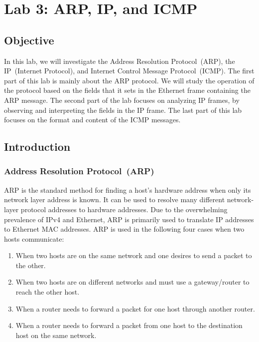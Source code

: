 \chapter{Lab 3: ARP, IP, and ICMP}\label{Lab3}

\section{Objective}

\noindent In this lab, we will investigate the Address Resolution Protocol~(ARP), the IP~(Internet Protocol), and Internet Control Message Protocol~(ICMP). The first part of this lab is mainly about the ARP protocol. We will study the operation of the protocol based on the fields that it sets in the Ethernet frame containing the ARP message.  The second part of the lab focuses on analyzing IP frames, by observing and interpreting the fields in the IP frame. The last part of this lab focuses on the format and content of the ICMP messages.

\section{Introduction}
\subsection{Address Resolution Protocol~(ARP)}
\par ARP is the standard method for finding a host's hardware address when only its network layer address is known.  It can be used to resolve many different network-layer protocol addresses to hardware addresses. Due to the overwhelming prevalence of IPv4 and Ethernet, ARP is primarily used to translate IP addresses to Ethernet MAC addresses. ARP is used in the following four cases when two hosts communicate:
\begin{enumerate}

\item When two hosts are on the same network and one desires to send a packet to the other.

\item When two hosts are on different networks and must use a gateway/router to reach the other host.

\item When a router needs to forward a packet for one host through another router.

\item When a router needs to forward a packet from one host to the destination host on the same network.
\end{enumerate}

